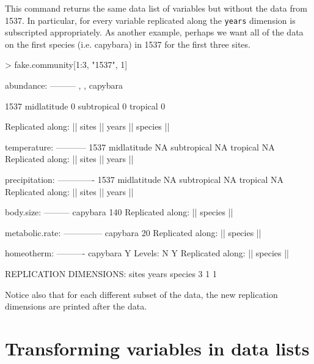 \documentclass{article}
\newcommand{\code}[1]{\texttt{#1}}
\numberwithin{exercise}{section}
\begin{document}
\noindent This command returns the same data list of variables but without the data from 1537.  In particular, for every variable replicated along the \code{years} dimension is subscripted appropriately.  As another example, perhaps we want all of the data on the first species (i.e. capybara) in 1537 for the first three sites.
\begin{Schunk}
\begin{Sinput}
> fake.community[1:3, "1537", 1]
\end{Sinput}
\begin{Soutput}
abundance:
---------
, , capybara

            1537
midlatitude    0
subtropical    0
tropical       0

Replicated along:  || sites || years || species || 


temperature:
-----------
            1537
midlatitude   NA
subtropical   NA
tropical      NA
Replicated along:  || sites || years || 


precipitation:
-------------
            1537
midlatitude   NA
subtropical   NA
tropical      NA
Replicated along:  || sites || years || 


body.size:
---------
capybara 
     140 
Replicated along:  || species || 


metabolic.rate:
--------------
capybara 
      20 
Replicated along:  || species || 


homeotherm:
----------
capybara 
       Y 
Levels: N Y
Replicated along:  || species || 


REPLICATION DIMENSIONS: 
  sites   years species 
      3       1       1 
\end{Soutput}
\end{Schunk}
\noindent Notice also that for each different subset of the data, the new replication dimensions are printed after the data.

\section{Transforming variables in data lists}
\end{document}
